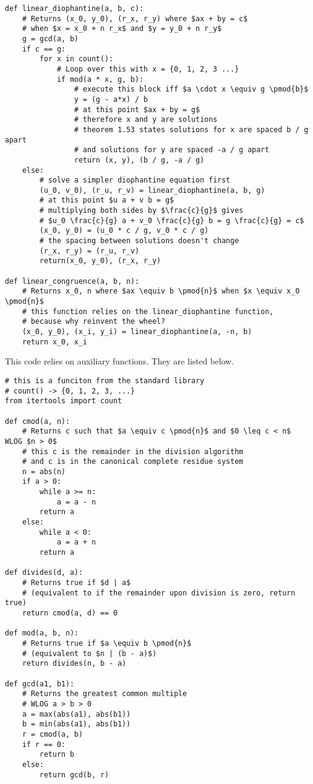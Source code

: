 \begin{verbatim}
def linear_diophantine(a, b, c):
    # Returns (x_0, y_0), (r_x, r_y) where $ax + by = c$
    # when $x = x_0 + n r_x$ and $y = y_0 + n r_y$
    g = gcd(a, b)
    if c == g:
        for x in count():
            # Loop over this with x = {0, 1, 2, 3 ...}
            if mod(a * x, g, b):
                # execute this block iff $a \cdot x \equiv g \pmod{b}$
                y = (g - a*x) / b
                # at this point $ax + by = g$
                # therefore x and y are solutions
                # theorem 1.53 states solutions for x are spaced b / g apart
                # and solutions for y are spaced -a / g apart
                return (x, y), (b / g, -a / g)
    else:
        # solve a simpler diophantine equation first
        (u_0, v_0), (r_u, r_v) = linear_diophantine(a, b, g)
        # at this point $u a + v b = g$
        # multiplying both sides by $\frac{c}{g}$ gives
        # $u_0 \frac{c}{g} a + v_0 \frac{c}{g} b = g \frac{c}{g} = c$
        (x_0, y_0) = (u_0 * c / g, v_0 * c / g)
        # the spacing between solutions doesn't change
        (r_x, r_y) = (r_u, r_v)
        return(x_0, y_0), (r_x, r_y)

def linear_congruence(a, b, n):
    # Returns x_0, n where $ax \equiv b \pmod{n}$ when $x \equiv x_0 \pmod{n}$
    # this function relies on the linear_diophantine function,
    # because why reinvent the wheel?
    (x_0, y_0), (x_i, y_i) = linear_diophantine(a, -n, b)
    return x_0, x_i
\end{verbatim}

This code relies on auxiliary functions. They are listed below.

\begin{verbatim}
# this is a funciton from the standard library
# count() -> {0, 1, 2, 3, ...}
from itertools import count

def cmod(a, n):
    # Returns c such that $a \equiv c \pmod{n}$ and $0 \leq c < n$ WLOG $n > 0$
    # this c is the remainder in the division algorithm
    # and c is in the canonical complete residue system
    n = abs(n)
    if a > 0:
        while a >= n:
            a = a - n
        return a
    else:
        while a < 0:
            a = a + n
        return a

def divides(d, a):
    # Returns true if $d | a$
    # (equivalent to if the remainder upon division is zero, return true)
    return cmod(a, d) == 0

def mod(a, b, n):
    # Returns true if $a \equiv b \pmod{n}$
    # (equivalent to $n | (b - a)$)
    return divides(n, b - a)

def gcd(a1, b1):
    # Returns the greatest common multiple
    # WLOG a > b > 0
    a = max(abs(a1), abs(b1))
    b = min(abs(a1), abs(b1))
    r = cmod(a, b)
    if r == 0:
        return b
    else:
        return gcd(b, r)
\end{verbatim}

